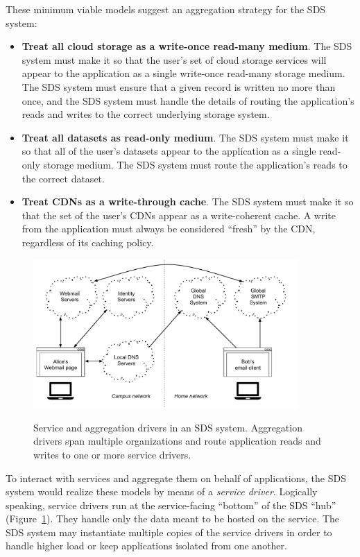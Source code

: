 These minimum viable models suggest an aggregation strategy for the SDS system:

\begin{itemize}
   \item \textbf{Treat all cloud storage as a write-once read-many medium}.  The SDS
      system must make it so that the user's set of cloud storage
      services will appear to the application as a single write-once read-many
      storage medium.  The SDS system must ensure that a given record is written
      no more than once, and the SDS system must handle the details of routing
      the application's reads and writes to the correct underlying storage system.
   \item \textbf{Treat all datasets as read-only medium}.  The SDS system must
      make it so that all of the user's datasets appear to the application as a
      single read-only storage medium.  The SDS system must route the
      application's reads to the correct dataset.
   \item \textbf{Treat CDNs as a write-through cache}.  The SDS system must make
      it so that the set of the user's CDNs appear as a write-coherent
      cache.  A write from the application must always be considered ``fresh''
      by the CDN, regardless of its caching policy.
\end{itemize}


\begin{figure}[h]
   \caption{Service and aggregation drivers in an SDS system.  Aggregation
   drivers span multiple organizations and route application reads and writes to
   one or more service drivers.}
   \centering
   \includegraphics[width=0.9\textwidth,page=3]{figures/dissertation-figures}
   \label{fig:chap2-driver-overview}
\end{figure}

To interact with services and aggregate them on behalf of applications, the SDS
system would realize these models by means of a \emph{service driver}.
Logically speaking, service drivers run at the service-facing ``bottom'' of the
SDS ``hub'' (Figure~\ref{fig:chap2-driver-overview}).
They handle only the data meant to be hosted on the service.  The SDS system may
instantiate multiple copies of the service drivers in order to handle higher
load or keep applications isolated from one another.


